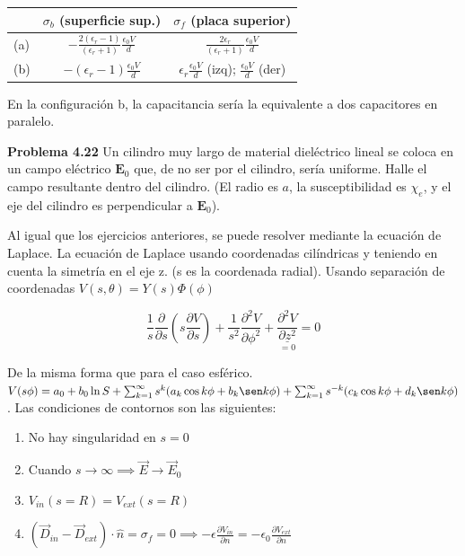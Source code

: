 \documentclass[12pt,a4paper]{report}
\newcommand{\esp}{\vspace{0.5cm}}
\begin{document}
	\esp
	
	\begin{tabular}{|l||c|c|}
		\hline
		& $\sigma_b$ (superficie sup.) & $\sigma_f$ (placa superior) \\ \hline \hline
		(a) & $-\frac{2(\epsilon_r-1)}{(\epsilon_r+1)} \frac{\epsilon_0 V}{d}$ & $\frac{2\epsilon_r}{(\epsilon_r+1)} \frac{\epsilon_0 V}{d}$ \\ \hline
		(b) & $-(\epsilon_r - 1) \frac{\epsilon_0 V}{d}$ & $\epsilon_r \frac{\epsilon_0 V}{d}$ (izq); $\frac{\epsilon_0 V}{d}$ (der) \\ \hline
	\end{tabular}
	
	\esp
	
	\begin{nota}
		En la configuración b, la capacitancia sería la equivalente a dos capacitores en paralelo.
	\end{nota}
	
	\esp	
	
	\textbf{Problema 4.22} Un cilindro muy largo de material dieléctrico lineal se coloca en un campo eléctrico $\mathbf{E}_0$ que, de no ser por el cilindro, sería uniforme. Halle el campo resultante dentro del cilindro. (El radio es $a$, la susceptibilidad es $\chi_e$, y el eje del cilindro es perpendicular a $\mathbf{E}_0$).
	
	\esp
	
	Al igual que los ejercicios anteriores, se puede resolver mediante la ecuación de Laplace. La ecuación de Laplace usando coordenadas cilíndricas y teniendo en cuenta la simetría en el eje z. (s es la coordenada radial). Usando separación de coordenadas $V(s, \theta)=Y(s)\Phi(\phi)$
	
	\esp
	
	\begin{equation*}
		\frac{1}{s} \frac{\partial}{\partial s} \left( s \frac{\partial V}{\partial s} \right) + \frac{1}{s^2} \frac{\partial^2 V}{\partial \phi^2} + \underset{= 0}{\underline{\frac{\partial^2 V}{\partial z^2}}} = 0
	\end{equation*}

	\esp

	De la misma forma que para el caso esférico. $V(s\phi)= a_0 + b_0\ln S + \sum_{k=1}^\infty s^k (a_k \cos k\phi + b_k \sen k\phi) + \sum_{k=1}^\infty s^{-k} (c_k \cos k\phi + d_k \sen k\phi)$. Las condiciones de contornos son las siguientes:
	
	\begin{enumerate}
		\item No hay singularidad en $s=0$
		\item Cuando $s\rightarrow\infty \implies \vec{E}\rightarrow\vec{E}_0$
		\item $V_{in}(s=R)=V_{ext}(s=R)$
		\item $(\vec{D}_{in}-\vec{D}_{ext})\cdot \hat{n} = \sigma_f = 0 \implies -\epsilon \frac{\partial V_{in}}{\partial n}=-\epsilon_0\frac{\partial V_{ext}}{\partial n}$ 
	\end{enumerate}
	
\end{document}
